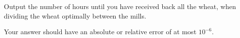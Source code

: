 
    Output the number of hours until you have received back all the wheat,
    when dividing the wheat optimally between the mills.

    Your answer should have an absolute or relative error of at most $10^{-6}$.
